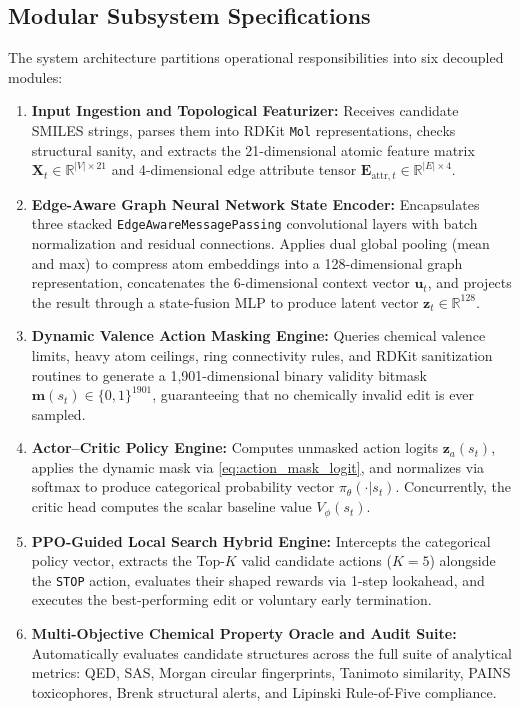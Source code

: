 \documentclass{ieeeaccess}
\begin{document}
\subsection{Modular Subsystem Specifications}
The system architecture partitions operational responsibilities into six decoupled modules:
\begin{enumerate}
    \item \textbf{Input Ingestion and Topological Featurizer:} Receives candidate SMILES strings, parses them into RDKit \texttt{Mol} representations, checks structural sanity, and extracts the 21-dimensional atomic feature matrix $\mathbf{X}_t \in \mathbb{R}^{|V| \times 21}$ and 4-dimensional edge attribute tensor $\mathbf{E}_{\text{attr}, t} \in \mathbb{R}^{|E| \times 4}$.
    \item \textbf{Edge-Aware Graph Neural Network State Encoder:} Encapsulates three stacked \texttt{EdgeAwareMessagePassing} convolutional layers with batch normalization and residual connections. Applies dual global pooling (mean and max) to compress atom embeddings into a 128-dimensional graph representation, concatenates the 6-dimensional context vector $\mathbf{u}_t$, and projects the result through a state-fusion MLP to produce latent vector $\mathbf{z}_t \in \mathbb{R}^{128}$.
    \item \textbf{Dynamic Valence Action Masking Engine:} Queries chemical valence limits, heavy atom ceilings, ring connectivity rules, and RDKit sanitization routines to generate a 1,901-dimensional binary validity bitmask $\mathbf{m}(s_t) \in \{0, 1\}^{1901}$, guaranteeing that no chemically invalid edit is ever sampled.
    \item \textbf{Actor--Critic Policy Engine:} Computes unmasked action logits $\mathbf{z}_a(s_t)$, applies the dynamic mask via \eqref{eq:action_mask_logit}, and normalizes via softmax to produce categorical probability vector $\pi_\theta(\cdot | s_t)$. Concurrently, the critic head computes the scalar baseline value $V_\phi(s_t)$.
    \item \textbf{PPO-Guided Local Search Hybrid Engine:} Intercepts the categorical policy vector, extracts the Top-$K$ valid candidate actions ($K=5$) alongside the \texttt{STOP} action, evaluates their shaped rewards via 1-step lookahead, and executes the best-performing edit or voluntary early termination.
    \item \textbf{Multi-Objective Chemical Property Oracle and Audit Suite:} Automatically evaluates candidate structures across the full suite of analytical metrics: QED, SAS, Morgan circular fingerprints, Tanimoto similarity, PAINS toxicophores, Brenk structural alerts, and Lipinski Rule-of-Five compliance.
\end{enumerate}
\end{document}
